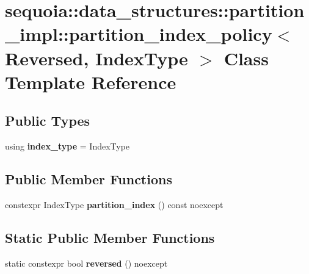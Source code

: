 \hypertarget{classsequoia_1_1data__structures_1_1partition__impl_1_1partition__index__policy}{}\section{sequoia\+::data\+\_\+structures\+::partition\+\_\+impl\+::partition\+\_\+index\+\_\+policy$<$ Reversed, Index\+Type $>$ Class Template Reference}
\label{classsequoia_1_1data__structures_1_1partition__impl_1_1partition__index__policy}
\subsection*{Public Types}
\begin{DoxyCompactItemize}
\item 
\mbox{\label{classsequoia_1_1data__structures_1_1partition__impl_1_1partition__index__policy_a791031411dda774f86f98bdae8cab482}} 
using {\bfseries index\+\_\+type} = Index\+Type
\end{DoxyCompactItemize}
\subsection*{Public Member Functions}
\begin{DoxyCompactItemize}
\item 
\mbox{\label{classsequoia_1_1data__structures_1_1partition__impl_1_1partition__index__policy_a624bcb33efe4c0507ca11c2aa21248c9}} 
constexpr Index\+Type {\bfseries partition\+\_\+index} () const noexcept
\end{DoxyCompactItemize}
\subsection*{Static Public Member Functions}
\begin{DoxyCompactItemize}
\item 
\mbox{\label{classsequoia_1_1data__structures_1_1partition__impl_1_1partition__index__policy_a215504192f55794aeb4c66c32b90bdc7}} 
static constexpr bool {\bfseries reversed} () noexcept
\end{DoxyCompactItemize}
